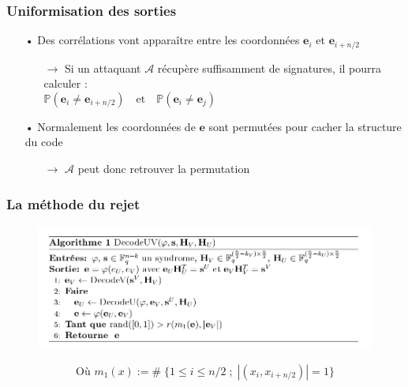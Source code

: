 \documentclass[10pt,a4paper]{beamer}
\theoremstyle{plain}
\theoremstyle{definition}
\newcommand{\e}{\mathbf{e}}
\begin{document}
\begin{frame}
\frametitle{Uniformisation des sorties}

\begin{itemize}
\item[•] Des corrélations vont apparaître entre les coordonnées $\e_i$ et $\e_{i+n/2}$
\vspace{0.05in}
	\begin{itemize}
	\item[$\rightarrow$] Si un attaquant $\mathcal{A}$ récupère suffisamment de signatures, il pourra calculer :
$$\mathbb{P}(\mathbf{e}_i \neq \mathbf{e}_{i+n/2})\quad \text{et}\quad\mathbb{P}(\mathbf{e}_i \neq \mathbf{e}_{j})\qquad\qquad\qquad\qquad\qquad\qquad\qquad\qquad\qquad\qquad$$
	\end{itemize}
	
\vspace{0.3in}
\item[•] Normalement les coordonnées de $\e$ sont permutées pour cacher la structure du code
\vspace{0.05in}
	\begin{itemize}
	\item[$\rightarrow$] $\mathcal{A}$ peut donc retrouver la permutation
	\end{itemize}
\end{itemize}

\end{frame}

\begin{frame}[fragile]
\frametitle{La méthode du rejet}
\vspace{-0.3in}
\begin{figure}[h]
\begin{center}
\includegraphics [scale=0.38]{algo_uv.png}
\end{center}
\end{figure}
$$ \text{Où  } m_1(x) := \# \; \{1  \leq i \leq n/2 \;;\; |(x_i, x_{i+n/2})| = 1\}$$
\end{frame}
\end{document}
